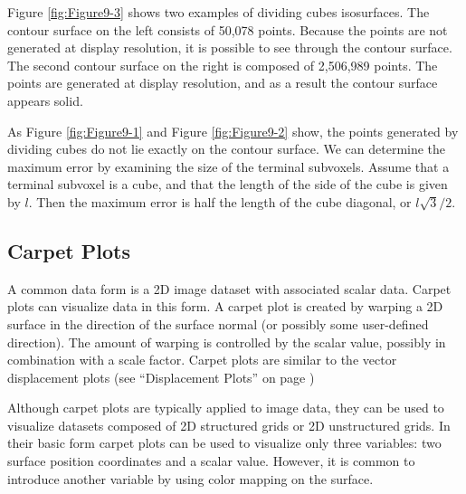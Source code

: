 Figure \ref{fig:Figure9-3} shows two examples of dividing cubes isosurfaces. The contour surface on the left consists of 50,078 points. Because the points are not generated at display resolution, it is possible to see through the contour surface. The second contour surface on the right is composed of 2,506,989 points. The points are generated at display resolution, and as a result the contour surface appears solid.

As Figure \ref{fig:Figure9-1} and Figure \ref{fig:Figure9-2} show, the points generated by dividing cubes do not lie exactly on the contour surface. We can determine the maximum error by examining the size of the terminal subvoxels. Assume that a terminal subvoxel is a cube, and that the length of the side of the cube is given by $l$. Then the maximum error is half the length of the cube diagonal, or $l \sqrt{3} / 2$.

\subsection{Carpet Plots}

A common data form is a 2D image dataset with associated scalar data. Carpet plots can visualize data in this form. A carpet plot is created by warping a 2D surface in the direction of the surface normal (or possibly some user-defined direction). The amount of warping is controlled by the scalar value, possibly in combination with a scale factor. Carpet plots are similar to the vector displacement plots (see ``Displacement Plots'' on page \pageref{subsec:displacement_plots})

Although carpet plots are typically applied to image data, they can be used to visualize datasets composed of 2D structured grids or 2D unstructured grids. In their basic form carpet plots can be used to visualize only three variables: two surface position coordinates and a scalar value. However, it is common to introduce another variable by using color mapping on the surface.

